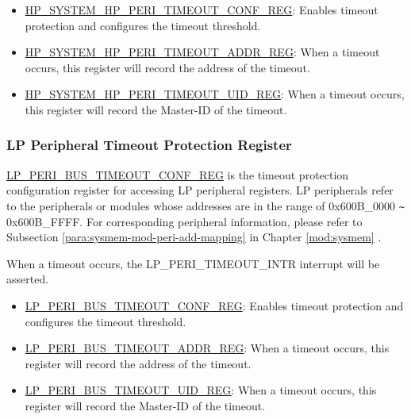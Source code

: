 \documentclass[main\_\_EN.tex]{subfiles}
\begin{document}
\begin{itemize}
    \item \hyperref[regdesc:HPSYSTEMHPPERITIMEOUTCONFREG]{HP\_SYSTEM\_HP\_PERI\_TIMEOUT\_CONF\_REG}: Enables timeout protection and configures the timeout threshold.
    \item \hyperref[regdesc:HPSYSTEMHPPERITIMEOUTADDRREG]{HP\_SYSTEM\_HP\_PERI\_TIMEOUT\_ADDR\_REG}:
    When a timeout occurs, this register will record the address of the timeout.
    \item \hyperref[regdesc:HPSYSTEMHPPERITIMEOUTUIDREG]{HP\_SYSTEM\_HP\_PERI\_TIMEOUT\_UID\_REG}:
    When a timeout occurs, this register will record the Master-ID of the timeout.
\end{itemize}

\subsubsection{LP Peripheral Timeout Protection Register}

\hyperref[regdesc:LPPERIBUSTIMEOUTCONFREG]{LP\_PERI\_BUS\_TIMEOUT\_CONF\_REG} is the timeout protection configuration register for accessing LP peripheral registers.
LP peripherals refer to the peripherals or modules whose addresses are in the range of 0x600B\_0000 \verb+~+ 0x600B\_FFFF. For corresponding peripheral information, please refer to Subsection \ref{para:sysmem-mod-peri-add-mapping} \textit{} in Chapter \ref{mod:sysmem} \textit{}.

When a timeout occurs, the LP\_PERI\_TIMEOUT\_INTR interrupt will be asserted.

\begin{itemize}
    \item \hyperref[regdesc:LPPERIBUSTIMEOUTCONFREG]{LP\_PERI\_BUS\_TIMEOUT\_CONF\_REG}: Enables timeout protection and configures the timeout threshold.
    \item \hyperref[regdesc:LPPERIBUSTIMEOUTADDRREG]{LP\_PERI\_BUS\_TIMEOUT\_ADDR\_REG}:
    When a timeout occurs, this register will record the address of the timeout.
    \item \hyperref[regdesc:LPPERIBUSTIMEOUTUIDREG]{LP\_PERI\_BUS\_TIMEOUT\_UID\_REG}:
    When a timeout occurs, this register will record the Master-ID of the timeout.
\end{itemize}





\end{document}
